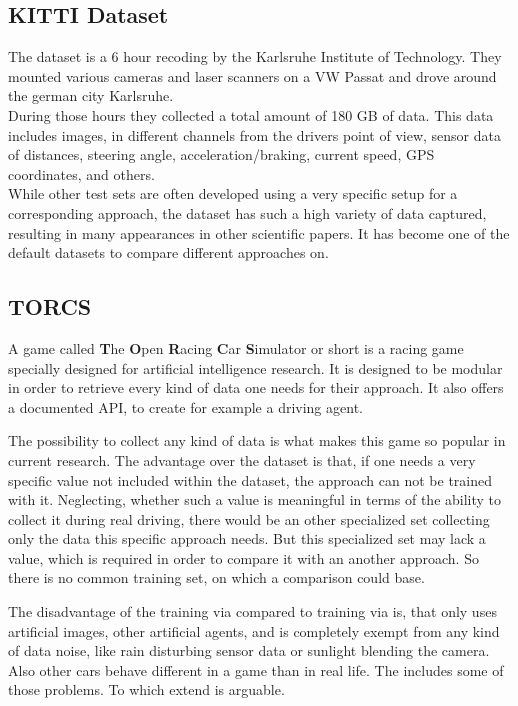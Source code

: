 \subsection{KITTI Dataset} \label{subsec: KITTI}

The \kitti dataset is a 6 hour recoding by the Karlsruhe Institute of Technology. They mounted various cameras and laser scanners on a VW Passat and drove around the german city Karlsruhe.\\
During those hours they collected a total amount of 180 GB of data. This data includes images, in different channels from the drivers point of view, sensor data of distances, steering angle, acceleration/braking, current speed, GPS coordinates, and others. \\
While other test sets are often developed using a very specific setup for a corresponding approach, the \kitti dataset has such a high variety of data captured, resulting in many appearances in other scientific papers. It has become one of the default datasets to compare different approaches on. \cite{KITTI}

\subsection{TORCS} \label{subsec: TORCS}

A game called \textbf{T}he \textbf{O}pen \textbf{R}acing \textbf{C}ar \textbf{S}imulator or short \torcs is a racing game specially designed for artificial intelligence research. It is designed to be modular in order to retrieve every kind of data one needs for their approach. It also offers a documented API, to create for example a driving agent. 

The possibility to collect any kind of data is what makes this game so popular in current research. The advantage over the \kitti dataset is that, if one needs a very specific value not included within the \kitti dataset, the approach can not be trained with it. Neglecting, whether such a value is meaningful in terms of the ability to collect it during real driving, there would be an other specialized set collecting only the data this specific approach needs. But this specialized set may lack a value, which is required in order to compare it with an another approach. So there is no common training set, on which a comparison could base.


The disadvantage of the training via \torcs compared to training via \kitti is, that \torcs only uses artificial images, other artificial agents, and is completely exempt from any kind of data noise, like rain disturbing sensor data or sunlight blending the camera. Also other cars behave different in a game than in real life. The \kitti includes some of those problems. To which extend is arguable. \cite{wymann2000torcs}

